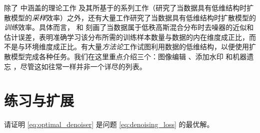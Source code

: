 \documentclass[../../book-main_zh.tex]{subfiles}
\begin{document}
除了  中涵盖的理论工作 \citep{li2024d} 及其所基于的系列工作（研究了当数据具有低维结构时扩散模型的\textit{采样}效率）之外，还有大量工作研究了当数据具有低维结构时扩散模型的\textit{训练}效率。具体而言，\citet{chen2023score} 和 \citep{wang2024diffusion} 刻画了当数据属于低秩高斯混合分布时去噪器的近似和估计误差，表明准确学习该分布所需的训练样本数量与数据的内在维度成正比，而不是与环境维度成正比。有大量\textit{方法论}工作试图利用数据的低维结构，以便使用扩散模型完成各种任务。我们在这里重点介绍三个：图像编辑 \citep{chen2024exploring}、添加水印 \citep{li2024shallow} 和机器遗忘 \citep{chen2025dual}，尽管这如往常一样并非一个详尽的列表。

\section{练习与扩展}

\begin{exercise}
    请证明 \eqref{eq:optimal_denoiser} 是问题 \eqref{eq:denoising_loss} 的最优解。
\end{exercise}
\end{document}
